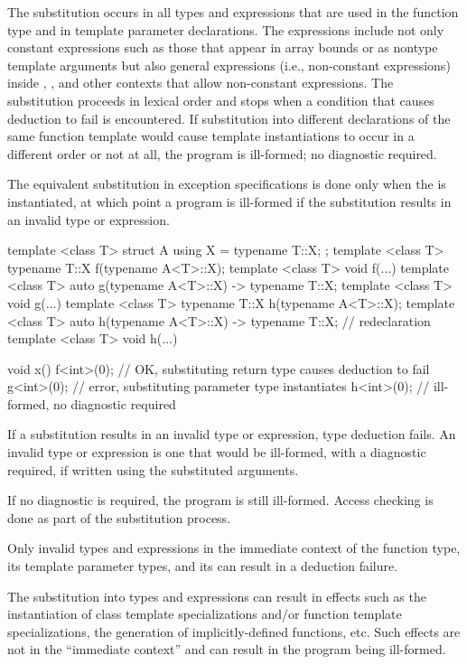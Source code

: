 \pnum
The substitution occurs in all types and expressions that are used in the function
type and in template parameter declarations. The expressions include not only
constant expressions such as those that appear in array bounds or as nontype
template arguments but also general expressions (i.e., non-constant expressions)
inside , , and other contexts that allow non-constant
expressions. The substitution proceeds in lexical order and stops when
a condition that causes deduction to fail is encountered.
If substitution into different declarations of the same function template would
cause template instantiations to occur in a different order or not at all,
the program is ill-formed; no diagnostic required.
\begin{note}
The equivalent substitution in exception specifications is
done only when the  is instantiated,
at which point a program is ill-formed
if the substitution results in an invalid type or expression.
\end{note}
\begin{example}
\begin{codeblock}
template <class T> struct A { using X = typename T::X; };
template <class T> typename T::X f(typename A<T>::X);
template <class T> void f(...) { }
template <class T> auto g(typename A<T>::X) -> typename T::X;
template <class T> void g(...) { }
template <class T> typename T::X h(typename A<T>::X);
template <class T> auto h(typename A<T>::X) -> typename T::X;   // redeclaration
template <class T> void h(...) { }

void x() {
  f<int>(0);        // OK, substituting return type causes deduction to fail
  g<int>(0);        // error, substituting parameter type instantiates 
  h<int>(0);        // ill-formed, no diagnostic required
}
\end{codeblock}
\end{example}

\pnum
If a substitution results in an invalid type or expression, type deduction fails. An
invalid type or expression is one that would be ill-formed, with a diagnostic
required, if written using the substituted arguments.
\begin{note}
If no
diagnostic is required, the program is still ill-formed. Access checking is done
as part of the substitution
process.
\end{note}
Only invalid types and expressions in the immediate context of
the function type,
its template parameter types,
and its 
can result in a deduction failure.
\begin{note}
The substitution into types and expressions can result
in effects such as the instantiation of class template specializations and/or
function template specializations, the generation of implicitly-defined functions,
etc. Such effects are not in the ``immediate context'' and can result in the
program being ill-formed.
\end{note}

